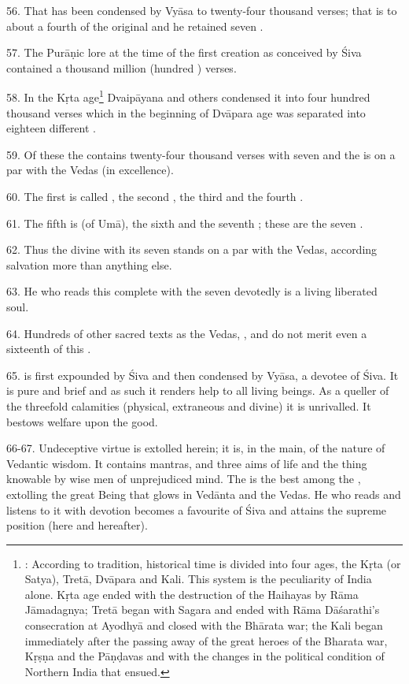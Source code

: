 56. That has been condensed by Vyāsa to twenty-four thousand verses; that is to
about a fourth of the original  and he retained seven .

57. The Purāṇic lore at the time of the first creation as conceived by Śiva
contained a thousand million (hundred ) verses.

58. In the Kṛta age\footnote{: According to tradition, historical time
is divided into four ages, \viz the Kṛta (or Satya), Tretā, Dvāpara and Kali.
This system is the peculiarity of India alone. Kṛta age ended with the
destruction of the Haihayas by Rāma Jāmadagnya; Tretā began with Sagara and
ended with Rāma Dāśarathi’s consecration at Ayodhyā and closed with the Bhārata
war; the Kali began immediately after the passing away of the great heroes of
the Bharata war, Kṛṣṇa and the Pāṇḍavas and with the changes in the political
condition of Northern India that ensued.} Dvaipāyana and others condensed it
into four hundred thousand verses which in the beginning of Dvāpara age was
separated into eighteen different .

59. Of these the  contains twenty-four thousand verses with seven
 and the  is on a par with the Vedas (in excellence).

60. The first  is called , the second ,
the third  and the fourth .

61. The fifth is  (of Umā), the sixth  and the seventh
; these are the seven .

62. Thus the divine  with its seven  stands on
a par with the Vedas, according salvation more than anything else.

63. He who reads this  complete with the seven 
devotedly is a living liberated soul.

64. Hundreds of other sacred texts as the Vedas, ,
and  do not merit even a sixteenth of this .

65.  is first expounded by Śiva and then condensed by Vyāsa,
a devotee of Śiva. It is pure and brief and as such it renders help to all
living beings. As a queller of the threefold calamities (physical, extraneous
and divine) it is unrivalled. It bestows welfare upon the good.

66-67. Undeceptive virtue is extolled herein; it is, in the main, of the nature
of Vedantic wisdom. It contains mantras, and three aims of life and the thing
knowable by wise men of unprejudiced mind. The  is the best among
the , extolling the great Being that glows in Vedānta and the Vedas.
He who reads and listens to it with devotion becomes a favourite of Śiva and
attains the supreme position (here and hereafter).

